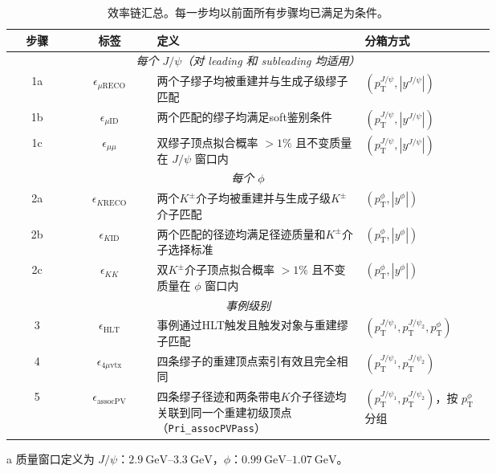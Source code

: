 \begin{table}[htbp]
  \centering
  \begin{threeparttable}[c]
    \caption{效率链汇总。每一步均以前面所有步骤均已满足为条件。}
    \label{tab:efficiency-chain}
    \small
    \begin{tabular}{ccp{0.43\linewidth}p{0.27\linewidth}}
      \toprule
      步骤 & 标签 & 定义 & 分箱方式 \\
      \midrule
      \multicolumn{4}{c}{\textit{每个 $J/\psi$（对 leading 和 subleading 均适用）}} \\
      1a & $\epsilon_{\mu\mathrm{RECO}}$ & 两个子缪子均被重建并与生成子级缪子匹配 & $(p_{\mathrm T}^{J/\psi}, |y^{J/\psi}|)$ \\
      1b & $\epsilon_{\mu\mathrm{ID}}$   & 两个匹配的缪子均满足soft鉴别条件 & $(p_{\mathrm T}^{J/\psi}, |y^{J/\psi}|)$ \\
      1c & $\epsilon_{\mu\mu}$          & 双缪子顶点拟合概率 $> 1\%$ 且不变质量在 $J/\psi$ 窗口内\tnote{a} & $(p_{\mathrm T}^{J/\psi}, |y^{J/\psi}|)$ \\
      \midrule
      \multicolumn{4}{c}{\textit{每个 $\phi$}} \\
      2a & $\epsilon_{K\mathrm{RECO}}$  & 两个$K^\pm$介子均被重建并与生成子级$K^\pm$介子匹配 & $(p_{\mathrm T}^{\phi}, |y^{\phi}|)$ \\
      2b & $\epsilon_{K\mathrm{ID}}$    & 两个匹配的径迹均满足径迹质量和$K^\pm$介子选择标准 & $(p_{\mathrm T}^{\phi}, |y^{\phi}|)$ \\
      2c & $\epsilon_{KK}$              & 双$K^\pm$介子顶点拟合概率 $>1\%$ 且不变质量在 $\phi$ 窗口内\tnote{a} & $(p_{\mathrm T}^{\phi}, |y^{\phi}|)$ \\
      \midrule
      \multicolumn{4}{c}{\textit{事例级别}} \\
      3  & $\epsilon_{\mathrm{HLT}}$    & 事例通过HLT触发且触发对象与重建缪子匹配 & $(p_{\mathrm T}^{J/\psi_1}, p_{\mathrm T}^{J/\psi_2}, p_{\mathrm T}^{\phi})$ \\
      4  & $\epsilon_{4\mu\mathrm{vtx}}$& 四条缪子的重建顶点索引有效且完全相同 & $(p_{\mathrm T}^{J/\psi_1}, p_{\mathrm T}^{J/\psi_2})$ \\
      5  & $\epsilon_{\mathrm{assocPV}}$& 四条缪子径迹和两条带电$K$介子径迹均关联到同一个重建初级顶点（\texttt{Pri\_assocPVPass}） & $(p_{\mathrm T}^{J/\psi_1}, p_{\mathrm T}^{J/\psi_2})$，按 $p_{\mathrm T}^{\phi}$ 分组 \\
      \bottomrule
    \end{tabular}
    \begin{tablenotes}
      \item [a] 质量窗口定义为 $J/\psi$：$\SIrange{2.9}{3.3}{\giga\eV}$，$\phi$：$\SIrange{0.99}{1.07}{\giga\eV}$。
    \end{tablenotes}
  \end{threeparttable}
\end{table}


